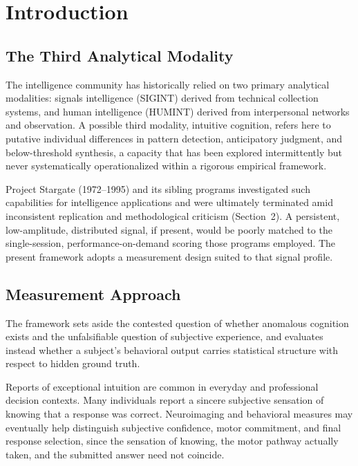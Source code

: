 \documentclass[11pt,letterpaper]{article}
\begin{document}
\section{Introduction}

\subsection{The Third Analytical Modality}

The intelligence community has historically relied on two primary analytical modalities: signals intelligence (SIGINT) derived from technical collection systems, and human intelligence (HUMINT) derived from interpersonal networks and observation. A possible third modality, intuitive cognition, refers here to putative individual differences in pattern detection, anticipatory judgment, and below-threshold synthesis, a capacity that has been explored intermittently but never systematically operationalized within a rigorous empirical framework.

Project Stargate (1972--1995) and its sibling programs investigated such capabilities for intelligence applications and were ultimately terminated amid inconsistent replication and methodological criticism (Section~2). A persistent, low-amplitude, distributed signal, if present, would be poorly matched to the single-session, performance-on-demand scoring those programs employed. The present framework adopts a measurement design suited to that signal profile.

\subsection{Measurement Approach}
\label{sec:measurement}

The framework sets aside the contested question of whether anomalous cognition exists and the unfalsifiable question of subjective experience, and evaluates instead whether a subject's behavioral output carries statistical structure with respect to hidden ground truth.

Reports of exceptional intuition are common in everyday and professional decision contexts. Many individuals report a sincere subjective sensation of knowing that a response was correct. Neuroimaging and behavioral measures may eventually help distinguish subjective confidence, motor commitment, and final response selection, since the sensation of knowing, the motor pathway actually taken, and the submitted answer need not coincide.
\end{document}
